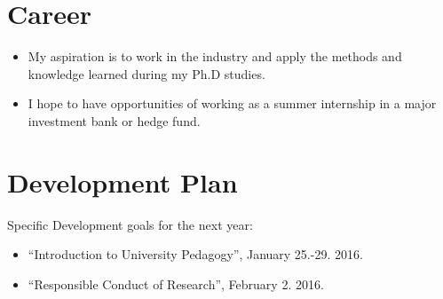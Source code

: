 \documentclass{article}
\begin{document}
\section{Career}
\begin{itemize}
\item My aspiration is to work in the industry and apply the methods
  and knowledge learned during my Ph.D studies.
\item I hope to have opportunities of working as a summer internship
  in a major investment bank or hedge fund.
\end{itemize}

\section{Development Plan}
Specific Development goals for the next year:
\begin{itemize}
\item ``Introduction to University Pedagogy'', January 25.-29. 2016.
\item ``Responsible Conduct of Research'', February 2. 2016.
\end{itemize}



\end{document}
